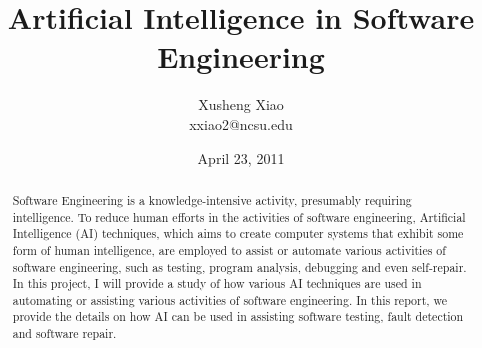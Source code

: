 \documentclass[times, 10pt,onecolumn]{article}
\title{Artificial Intelligence in Software Engineering}
\author{
Xusheng Xiao\\
\small{xxiao2@ncsu.edu}\\
}
\date{April 23, 2011}
\begin{document}
 
\maketitle
\thispagestyle{empty}
\pagestyle{empty}

\begin{abstract}
Software Engineering is a knowledge-intensive activity, presumably requiring intelligence. To reduce human efforts in the activities of software engineering, Artificial Intelligence (AI) techniques, which aims to create computer systems that exhibit some form of human intelligence, are employed to assist or automate various activities of software engineering, such as testing, program analysis, debugging and even self-repair. In this project, I will provide a study of how various AI techniques are used in automating or assisting various activities of software engineering. In this report, we provide the details on how AI can be used in assisting software testing, fault detection and software repair. 
\end{abstract}











\end{document}
